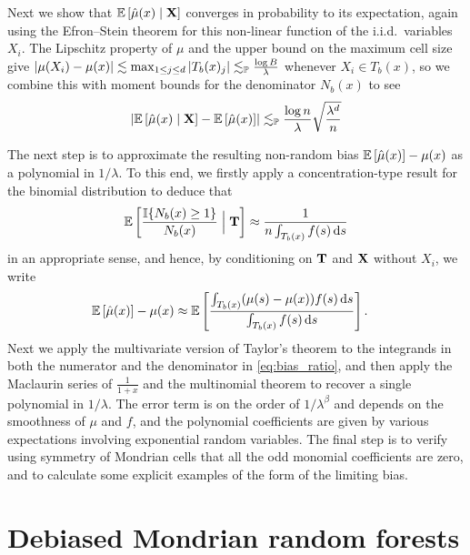 Next we show that $\E \left[ \hat \mu(x) \mid \bX \right]$
converges in probability to its expectation, again using
the Efron--Stein theorem for this non-linear function of the i.i.d.\
variables $X_i$. The Lipschitz property of $\mu$
and the upper bound on the maximum cell size give
$|\mu(X_i) - \mu(x)|
\lesssim \max_{1 \leq j \leq d} |T_b(x)_j|
\lesssim_\P \frac{\log B}{\lambda}$
whenever $X_i \in T_b(x)$,
so we combine this with moment bounds for the denominator $N_b(x)$ to see
%
\begin{align*}
  \left|
  \E \left[ \hat \mu(x) \mid \bX \right]
  - \E \left[ \hat \mu(x) \right]
  \right|
  \lesssim_\P
  \frac{\log n}{\lambda}
  \sqrt{\frac{\lambda^d}{n}}
\end{align*}

The next step is to approximate the resulting non-random bias
$\E \left[ \hat \mu(x) \right] - \mu(x)$ as a polynomial in $1/\lambda$.
To this end, we firstly apply a concentration-type result for the binomial
distribution to deduce that
%
\begin{align*}
  \E \left[ \frac{\I\{N_b(x) \geq 1\}}{N_b(x)} \Bigm| \bT \right]
  \approx
  \frac{1}{n \int_{T_b(x)} f(s) \diff s}
\end{align*}
%
in an appropriate sense, and hence,
by conditioning on $\bT$ and $\bX$ without $X_i$, we write
%
\begin{align}
  \label{eq:bias_ratio}
  \E \left[ \hat \mu(x) \right]
  - \mu(x)
  &\approx
  \E \left[
    \frac{\int_{T_b(x)} (\mu(s) - \mu(x)) f(s) \diff s}
    {\int_{T_b(x)} f(s) \diff s}
  \right].
\end{align}
%
Next we apply the multivariate version of Taylor's theorem to the integrands
in both the numerator and the denominator in \eqref{eq:bias_ratio},
and then apply the Maclaurin series of $\frac{1}{1+x}$
and the multinomial theorem to recover a single polynomial in $1/\lambda$.
The error term is on the order of $1/\lambda^\beta$ and depends on
the smoothness of $\mu$ and $f$,
and the polynomial coefficients are given by
various expectations involving exponential random variables.
The final step is to verify using symmetry of Mondrian cells that all
the odd monomial coefficients are zero,
and to calculate some explicit examples of the
form of the limiting bias.

\section{Debiased Mondrian random forests}%
\label{sec:debiased}

